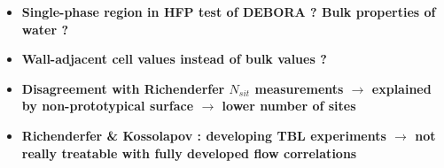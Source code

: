 \documentclass[8pt, a4paper]{article}
\begin{document}
\begin{itemize}
\item \textbf{Single-phase region in HFP test of DEBORA ? Bulk properties of water ?}

\item \textbf{Wall-adjacent cell values instead of bulk values ?}


\item \textbf{Disagreement with Richenderfer $N_{sit}$ measurements $\rightarrow$ explained by non-prototypical surface $\rightarrow$ lower number of sites}



\item \textbf{Richenderfer \& Kossolapov : developing TBL experiments $\rightarrow$ not really treatable with fully developed flow correlations}




\end{itemize}
\end{document}
